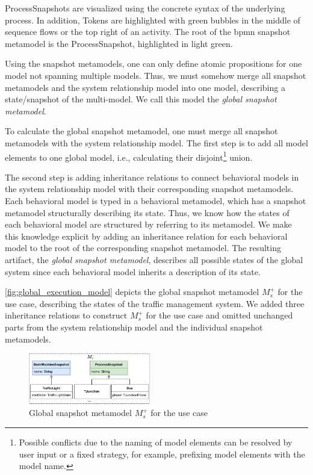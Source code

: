 \documentclass{jot}
\begin{document}
\textsf{ProcessSnapshot}s are visualized using the concrete syntax of the underlying process.
In addition, \textsf{Token}s are highlighted with green bubbles in the middle of sequence flows or the top right of an activity.
The root of the \gls*{bpmn} snapshot metamodel is the \textsf{ProcessSnapshot}, highlighted in light green.

Using the snapshot metamodels, one can only define atomic propositions for one model not spanning multiple models.
Thus, we must somehow merge all snapshot metamodels and the system relationship model into one model, describing a state/snapshot of the multi-model.
We call this model the \emph{global snapshot metamodel}.

To calculate the global snapshot metamodel, one must merge all snapshot metamodels with the system relationship model.
The first step is to add all model elements to one global model, i.e., calculating their disjoint\footnote{Possible conflicts due to the naming of model elements can be resolved by user input or a fixed strategy, for example, prefixing model elements with the model name.} union.

The second step is adding inheritance relations to connect behavioral models in the system relationship model with their corresponding snapshot metamodels.
Each behavioral model is typed in a behavioral metamodel, which has a snapshot metamodel structurally describing its state.
Thus, we know how the states of each behavioral model are structured by referring to its metamodel.
We make this knowledge explicit by adding an inheritance relation for each behavioral model to the root of the corresponding snapshot metamodel.
The resulting artifact, the \emph{global snapshot metamodel}, describes all possible states of the global system since each behavioral model inherits a description of its state.

\autoref{fig:global_execution_model} depicts the global snapshot metamodel $M_s^+$ for the use case, describing the states of the traffic management system.
We added three inheritance relations to construct $M_s^+$ for the use case and omitted unchanged parts from the system relationship model and the individual snapshot metamodels.

\begin{figure}[h]
    \centering
    \includegraphics[width=0.475\textwidth]{figures/global_s_model.pdf}
    \caption{Global snapshot metamodel $M_s^+$ for the use case}
    \label{fig:global_execution_model}
\end{figure}
\end{document}
